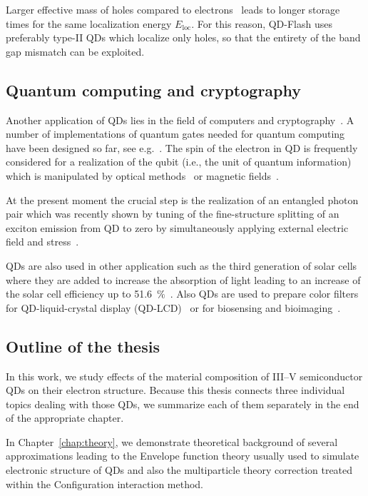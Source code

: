 \documentclass[
a4paper, %
11pt, %
onecolumn, %
openany, %
oldfontcommands,
]{memoir}
\begin{document}
Larger effective mass of holes compared to electrons~\cite{sze} leads to longer storage times for the same localization energy $E_\mathrm{loc}$. For this reason, QD-Flash uses preferably type-II QDs which localize only holes, so that the entirety of the band gap mismatch can be exploited.

\subsection*{Quantum computing and cryptography}
Another application of QDs lies in the field of computers and cryptography~\cite{Feynman,Deutsch,Loss}. A number of implementations of quantum gates needed for quantum computing have been designed so far, see e.g.~\cite{Bennett}. The spin of the electron in QD is frequently considered for a realization of the qubit (i.e., the unit of quantum information)~\cite{Loss} which is manipulated by optical methods~\cite{Hafenbrak} or magnetic fields~\cite{Burkard}. 

At the present moment the crucial step is the realization of an entangled photon pair which was recently shown by tuning of the fine-structure splitting of an exciton emission from QD to zero by simultaneously applying external electric field and stress~\cite{Trotta}.

\vspace{0.2cm}
QDs are also used in other application such as the third generation of solar cells where they are added to increase the absorption of light leading to an increase of the solar cell efficiency up to 51.6~$\%$~\cite{Jiang_NonoEn2015_QDsolarcell}. Also QDs are used to prepare color filters for QD-liquid-crystal display (QD-LCD)~\cite{Chen_IEEE_2017_QLED} or for biosensing and bioimaging~\cite{Li_JMaterChemB_2014_biosensing}.

\subsection*{Outline of the thesis}
\vspace{0.2cm}
In this work, we study effects of the material composition of III--V semiconductor QDs on their electron structure. Because this thesis connects three individual topics dealing with those QDs, we summarize each of them separately in the end of the appropriate chapter.

In Chapter~\ref{chap:theory}, we demonstrate theoretical background of several approximations leading to the Envelope function theory usually used to simulate electronic structure of QDs and also the multiparticle theory correction treated within the Configuration interaction method.
\end{document}
